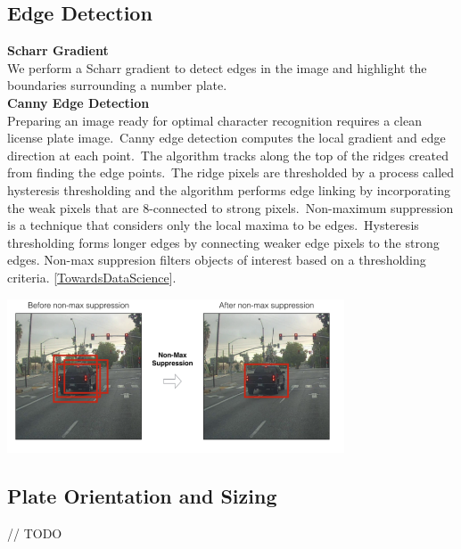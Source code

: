 \documentclass[a4paper,twoside,10pt]{report}
\begin{document}
\subsection{Edge Detection}
\textbf{Scharr Gradient}\\
We perform a Scharr gradient to detect edges in the image and highlight the boundaries surrounding a number plate. \\[3pt]
\textbf{Canny Edge Detection}\\
Preparing an image ready for optimal character recognition requires a clean license plate image.\
Canny edge detection computes the local gradient and edge direction at each point.\
The algorithm tracks along the top of the ridges created from finding the edge points.\
The ridge pixels are thresholded by a process called hysteresis thresholding and the algorithm performs edge linking by incorporating the weak pixels that are 8-connected to strong pixels.\
Non-maximum suppression is a technique that considers only the local maxima to be edges.\
Hysteresis thresholding forms longer edges by connecting weaker edge pixels to the strong edges.
Non-max suppresion filters objects of interest based on a thresholding criteria. [\href{https://towardsdatascience.com/non-maximum-suppression-nms-93ce178e177c}{TowardsDataScience}].
\begin{center}
  \includegraphics[width=10cm]{images/Non-maximum Suppression.png}
\end{center}
\subsection{Plate Orientation and Sizing}
// TODO 
\end{document}
